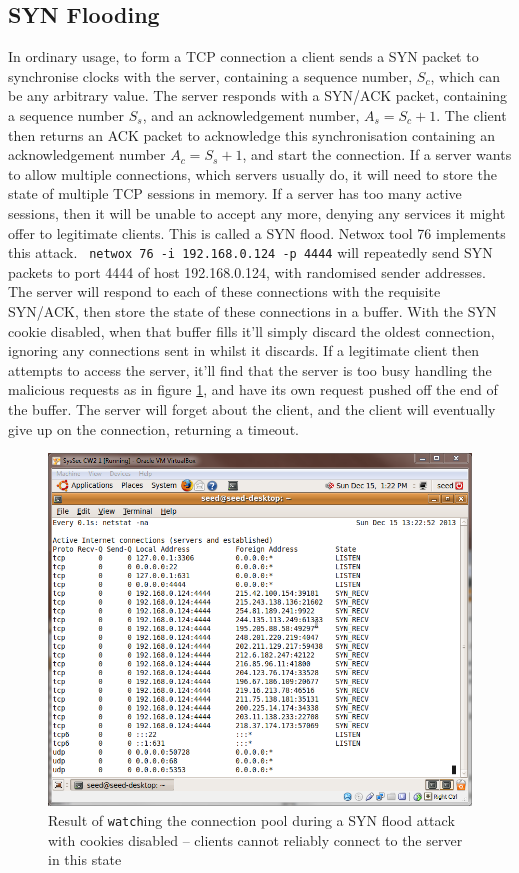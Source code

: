 \subsection{SYN Flooding}\label{sec_synflood}

In ordinary usage, to form a TCP connection a client sends a SYN packet to synchronise clocks with the server,
containing a sequence number, $S_c$, which can be any arbitrary value. The server responds with a SYN/ACK packet,
containing a sequence number $S_s$, and an acknowledgement number, $A_s = S_c+1$. The client then returns an ACK packet
to acknowledge this synchronisation containing an acknowledgement number $A_c = S_s+1$, and start the connection. If a
server wants to allow multiple connections, which servers usually do, it will need to store the state of multiple TCP
sessions in memory. If a server has too many active sessions, then it will be unable to accept any more, denying any
services it might offer to legitimate clients. This is called a SYN flood. Netwox tool 76 implements this attack. {\tt
netwox 76 -i 192.168.0.124 -p 4444} will repeatedly send SYN packets to port 4444 of host 192.168.0.124, with randomised
sender addresses. The server will respond to each of these connections with the requisite SYN/ACK, then store the state
of these connections in a buffer. With the SYN cookie disabled, when that buffer fills it'll simply discard the oldest
connection, ignoring any connections sent in whilst it discards. If a legitimate client then attempts to access the
server, it'll find that the server is too busy handling the malicious requests as in figure \ref{fig:flood_no_cookie},
and have its own request pushed off the end of the buffer. The server will forget about the client, and the client will
eventually give up on the connection, returning a timeout.

\begin{figure}[h]
    \centering \includegraphics[width=.7\linewidth]{images/syn_flood_during.png}
    \caption{Result of {\tt watch}ing the connection pool during a SYN flood attack with cookies disabled -- clients
    cannot reliably connect to the server in this state}
    \label{fig:flood_no_cookie}
\end{figure}

